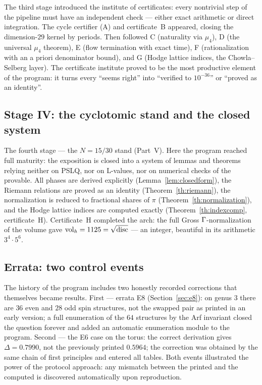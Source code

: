 The third stage introduced the institute of certificates: every
nontrivial step of the pipeline must have an independent check ---
either exact arithmetic or direct integration. The cycle certifier
(A) and certificate~B appeared, closing the dimension-$29$ kernel by
periods. Then followed C (naturality via $\mu_4$), D (the universal
$\mu_4$ theorem), E (flow termination with exact time), F
(rationalization with an a priori denominator bound), and G (Hodge
lattice indices, the Chowla--Selberg layer). The certificate
institute proved to be the most productive element of the program:
it turns every ``seems right'' into ``verified to $10^{-36}$'' or
``proved as an identity''.

\subsection{Stage IV: the cyclotomic stand and the closed system}

The fourth stage --- the $N=15/30$ stand (Part~V). Here the program
reached full maturity: the exposition is closed into a system of
lemmas and theorems relying neither on PSLQ, nor on L-values, nor on
numerical checks of the provable. All phases are derived explicitly
(Lemma~\ref{lem:closedform}), the Riemann relations are proved as an
identity (Theorem~\ref{th:riemann}), the normalization is reduced to
fractional shares of $\pi$ (Theorem~\ref{th:normalization}), and the
Hodge lattice indices are computed exactly
(Theorem~\ref{th:indexcomp}, certificate~H). Certificate~H completed
the arch: the full Gross $\Gamma$-normalization of the volume gave
$\mathrm{vol}_h=1125=\sqrt{\operatorname{disc}}$ --- an integer, beautiful in its
arithmetic $3^4\cdot5^6$.

\subsection{Errata: two control events}

The history of the program includes two honestly recorded
corrections that themselves became results. First --- errata E8
(Section~\ref{sec:e8}): on genus $3$ there are $36$ even and $28$ odd spin structures,
not the swapped pair as printed in an early version; a full
enumeration of the $64$ structures by the Arf invariant closed the
question forever and added an automatic enumeration module to the
program. Second --- the E6 case on the torus: the correct derivation
gives $\Delta=0.7990$, not the previously printed $0.5964$; the
correction was obtained by the same chain of first principles and
entered all tables. Both events illustrated the power of the
protocol approach: any mismatch between the printed and the computed
is discovered automatically upon reproduction.

